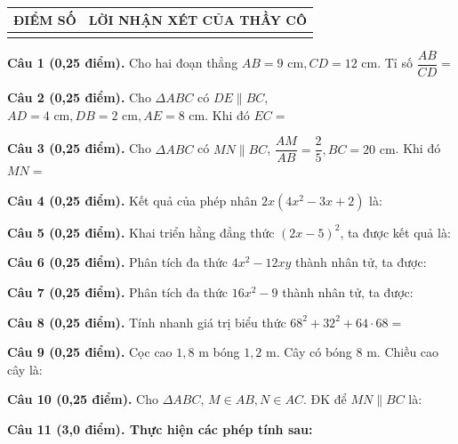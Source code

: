 \documentclass[12pt,a4paper]{article}
\begin{document}
\vspace{1.0mm}

\noindent
\begin{tabularx}{\linewidth}{|p{3.2cm}|X|}
\hline
\centering\textbf{ĐIỂM SỐ} & \centering\textbf{LỜI NHẬN XÉT CỦA THẦY CÔ} \tabularnewline
\hline
\rule{0pt}{1.8cm} & \tabularnewline
\hline
\end{tabularx}

\vspace{1.2mm}
\noindent\textbf{Câu 1 (0,25 điểm).} Cho hai đoạn thẳng $AB = 9\text{ cm}, CD = 12\text{ cm}$. Tỉ số $\dfrac{AB}{CD} =$ \par\vspace{3.0mm}
\noindent\textbf{Câu 2 (0,25 điểm).} Cho $\Delta ABC$ có $DE \parallel BC$, $AD = 4\text{ cm}, DB = 2\text{ cm}, AE = 8\text{ cm}$. Khi đó $EC =$ \par\vspace{3.0mm}
\noindent\textbf{Câu 3 (0,25 điểm).} Cho $\Delta ABC$ có $MN \parallel BC$, $\dfrac{AM}{AB} = \dfrac{2}{5}, BC = 20\text{ cm}$. Khi đó $MN =$ \par\vspace{3.0mm}
\noindent\textbf{Câu 4 (0,25 điểm).} Kết quả của phép nhân $2x(4x^2 - 3x + 2)$ là: \par\vspace{3.0mm}
\noindent\textbf{Câu 5 (0,25 điểm).} Khai triển hằng đẳng thức $(2x - 5)^2$, ta được kết quả là: \par\vspace{3.0mm}
\noindent\textbf{Câu 6 (0,25 điểm).} Phân tích đa thức $4x^2 - 12xy$ thành nhân tử, ta được: \par\vspace{3.0mm}
\noindent\textbf{Câu 7 (0,25 điểm).} Phân tích đa thức $16x^2 - 9$ thành nhân tử, ta được: \par\vspace{3.0mm}
\noindent\textbf{Câu 8 (0,25 điểm).} Tính nhanh giá trị biểu thức $68^2 + 32^2 + 64 \cdot 68 =$ \par\vspace{3.0mm}
\noindent\textbf{Câu 9 (0,25 điểm).} Cọc cao $1{,}8\text{ m}$ bóng $1{,}2\text{ m}$. Cây có bóng $8\text{ m}$. Chiều cao cây là: \par\vspace{3.0mm}
\noindent\textbf{Câu 10 (0,25 điểm).} Cho $\Delta ABC$, $M \in AB, N \in AC$. ĐK để $MN \parallel BC$ là: \par\vspace{3.0mm}
\vspace{0.4mm}
\noindent\textbf{Câu 11 (3,0 điểm). Thực hiện các phép tính sau:}
\vspace{0.6mm}
\end{document}

